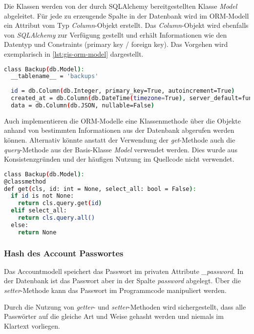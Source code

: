 Die Klassen werden von der durch SQLAlchemy bereitgestellten Klasse \textit{Model} abgeleitet. Für jede zu erzeugende Spalte in der Datenbank wird im ORM-Modell ein Attribut vom Typ \textit{Column}-Objekt erstellt. Das \textit{Column}-Objekt wird ebenfalls von \textit{SQLAlchemy} zur Verfügung gestellt und erhält Informationen wie den Datentyp und Constraints (primary key / foreign key).
Das Vorgehen wird exemplarisch in \autoref{lst:gis-orm-model} dargestellt.

\begin{lstlisting}[language=bash, frame=single, caption={GIS Beispiel eines ORM Models}, captionpos=b, label={lst:gis-orm-model}]
class Backup(db.Model):
  __tablename__ = 'backups'
  
  id = db.Column(db.Integer, primary_key=True, autoincrement=True)
  created_at = db.Column(db.DateTime(timezone=True), server_default=func.now(), nullable=False)
  data = db.Column(db.JSON, nullable=False)
\end{lstlisting}

Auch implementieren die ORM-Modelle eine Klassenmethode über die Objekte anhand von bestimmten Informationen aus der Datenbank abgerufen werden können. Alternativ könnte anstatt der Verwendung der \textit{get}-Methode auch die \textit{query}-Methode aus der Basis-Klasse \textit{Model} verwendet werden. Dies wurde aus Konsistenzgründen und der häufigen Nutzung im Quellcode nicht verwendet.

\begin{lstlisting}[language=bash, frame=single, caption={GIS Beispiel einer Get-Methode des ORM Models}, captionpos=b, label={lst:gis-orm-model}]
class Backup(db.Model):
@classmethod
def get(cls, id: int = None, select_all: bool = False):
  if id is not None:
    return cls.query.get(id)
  elif select_all:
    return cls.query.all()
  else:
    return None
\end{lstlisting}

\subsubsection{Hash des Account Passwortes}
Das Accountmodell speichert das Passwort im privaten Attribute \textit{\_password}. In der Datenbank ist das Passwort aber in der Spalte \textit{password} abgelegt. Über die \textit{setter}-Methode kann das Passwort im Programmcode manipuliert werden.

Durch die Nutzung von \textit{getter}- und \textit{setter}-Methoden wird sichergestellt, dass alle Passwörter auf die gleiche Art und Weise gehasht werden und niemals im Klartext vorliegen.


